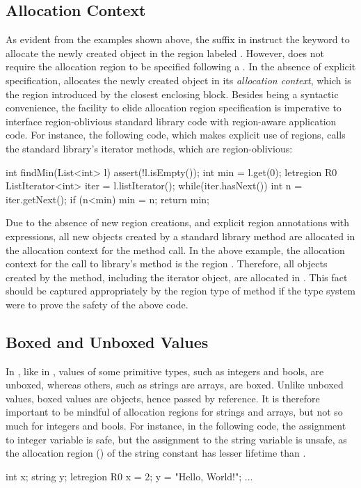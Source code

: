 \subsection{Allocation Context}
\label{sec:alloc-ctxt}

As evident from the examples shown above, the suffix  in
 instruct the  keyword to allocate the newly created
object in the region labeled . However, \name does not require
the allocation region to be specified following a . In the
absence of explicit specification, \name allocates the newly created
object in its \emph{allocation context}, which is the region
introduced by the closest enclosing  block. Besides being
a syntactic convenience, the facility to elide allocation region
specification is imperative to interface region-oblivious standard
library code with region-aware application code. For instance, the
following \name code, which makes explicit use of regions, calls
the standard library's iterator methods, which are region-oblivious:
\begin{center}
\begin{codejava}
  int findMin(List<int> l) {
    assert(!l.isEmpty());
    int min = l.get(0);
    letregion R0 {
      ListIterator<int> iter = l.listIterator();
      while(iter.hasNext()) {
        int n = iter.getNext();
        if (n<min) min = n;
      }
    }
    return min;
  }
\end{codejava}
\end{center}
Due to the absence of new region creations, and explicit region
annotations with  expressions, all new objects created by a
standard library method are allocated in the allocation context for
the method call. In the above example, the allocation context for the
call to  library's  method is the region
. Therefore, all objects created by the method, including the
iterator object, are allocated in . This fact should be captured
appropriately by the region type of  method if the
type system were to prove the safety of the above code.

\subsection{Boxed and Unboxed Values}

In \name, like in \csharp, values of some primitive types, such as
integers and bools, are unboxed, whereas others, such as strings are
arrays, are boxed. Unlike unboxed values, boxed values are objects,
hence passed by reference. It is therefore important to be mindful
of allocation regions for strings and arrays, but not so much for
integers and bools. For instance, in the following code, the
assignment to integer variable  is safe, but the assignment to
the string variable  is unsafe, as the allocation region ()
of the string constant has lesser lifetime than .
\begin{center}
\begin{codejava}
  int x;
  string y;
  letregion R0 {
    x = 2;
    y = "Hello, World!";
  }
  ...
\end{codejava}
\end{center}

